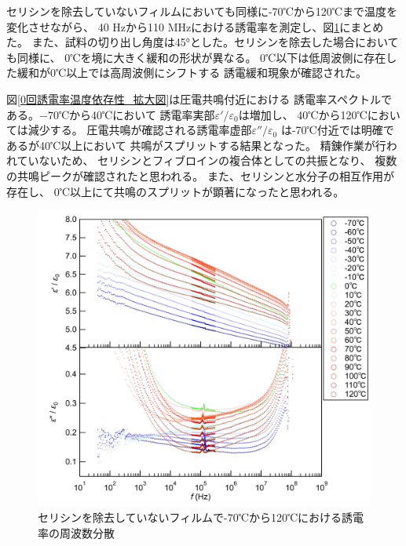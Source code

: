 \documentclass[dvipdfmx,12pt,a4paper]{jreport}
\begin{document}
			セリシンを除去していないフィルムにおいても同様に-70℃から120℃まで温度を変化させながら、
			40 Hzから110 MHzにおける誘電率を測定し、図\ref{温度_誘電率_セリシンあり}にまとめた。
			また、試料の切り出し角度は45°とした。セリシンを除去した場合においても同様に、
			0℃を境に大きく緩和の形状が異なる。
			0℃以下は低周波側に存在した緩和が0℃以上では高周波側にシフトする
			誘電緩和現象が確認された。

			図\ref{0回誘電率温度依存性_拡大図}は圧電共鳴付近における
			誘電率スペクトルである。$-70$℃から40℃において
			誘電率実部$\varepsilon'/\varepsilon_0$は増加し、
			40℃から120℃においては減少する。
			圧電共鳴が確認される誘電率虚部$\varepsilon''/\varepsilon_0$
			は-70℃付近では明確であるが40℃以上において
			共鳴がスプリットする結果となった。
			精錬作業が行われていないため、
			セリシンとフィブロインの複合体としての共振となり、
			複数の共鳴ピークが確認されたと思われる。
			また、セリシンと水分子の相互作用が存在し、
			0℃以上にて共鳴のスプリットが顕著になったと思われる。
			\begin{figure}[H]
				\centering
				\includegraphics[width=\linewidth]{温度_誘電率_セリシンあり.jpg}
				\caption{セリシンを除去していないフィルムで-70℃から120℃における誘電率の周波数分散}
				\label{温度_誘電率_セリシンあり}
			\end{figure}
			\newpage
\end{document}

